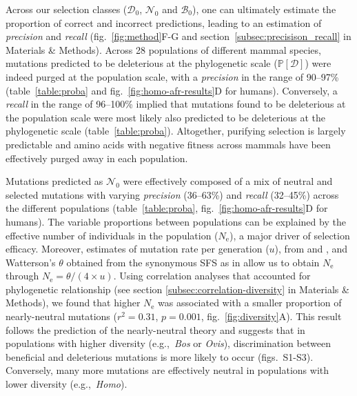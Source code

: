 \documentclass[9pt,twocolumn,twoside,lineno]{pnas-new}
\newcommand{\Ne}{N_{\text{e}}}
\newcommand{\proba}{\mathbb{P}}
\newcommand{\SphyDel}{\mathcal{D}_0}
\newcommand{\SphyNeu}{\mathcal{N}_0}
\newcommand{\SphyBen}{\mathcal{B}_0}
\newcommand{\SpopDel}{\mathcal{D}}
\newcommand{\ProbaPopDel}{\proba [ \SpopDel]}
\begin{document}
Across our selection classes ($\SphyDel$, $\SphyNeu$ and $\SphyBen$), one can ultimately estimate the proportion of correct and incorrect predictions, leading to an estimation of \textit{precision} and \textit{recall} (fig.~\ref{fig:method}F-G and section~\ref{subsec:precisison_recall} in Materials \& Methods).
Across 28 populations of different mammal species, mutations predicted to be deleterious at the phylogenetic scale ($\ProbaPopDel$) were indeed purged at the population scale, with a \textit{precision} in the range of 90--97\% (table~\ref{table:proba} and fig.~\ref{fig:homo-afr-results}D for humans).
Conversely, a \textit{recall} in the range of 96--100\% implied that mutations found to be deleterious at the population scale were most likely also predicted to be deleterious at the phylogenetic scale (table~\ref{table:proba}).
Altogether, purifying selection is largely predictable and amino acids with negative fitness across mammals have been effectively purged away in each population.

Mutations predicted as $\SphyNeu$ were effectively composed of a mix of neutral and selected mutations with varying \textit{precision} (36--63\%) and \textit{recall} (32--45\%) across the different populations (table~\ref{table:proba}, fig.~\ref{fig:homo-afr-results}D for humans).
The variable proportions between populations can be explained by the effective number of individuals in the population ($\Ne$), a major driver of selection efficacy.
Moreover, estimates of mutation rate per generation ($u$), from \cite[Bergeron et al]{bergeron_evolution_2023} and \cite[Orlando et al]{orlando_recalibrating_2013}, and Watterson’s $\theta$ obtained from the synonymous SFS as in \cite[Achaz]{achaz_frequency_2009} allow us to obtain $\Ne$ through $\Ne=\theta/(4 \times u)$.
Using correlation analyses that accounted for phylogenetic relationship (see section \ref{subsec:correlation-diversity} in Materials \& Methods), we found that higher $\Ne$ was associated with a smaller proportion of nearly-neutral mutations ($r^2=0.31$, $p=0.001$, fig.~\ref{fig:diversity}A).
This result follows the prediction of the nearly-neutral theory and suggests that in populations with higher diversity (e.g.,~\textit{Bos} or \textit{Ovis}), discrimination between beneficial and deleterious mutations is more likely to occur (figs.~S1-S3).
Conversely, many more mutations are effectively neutral in populations with lower diversity (e.g.,~\textit{Homo}).
\end{document}
